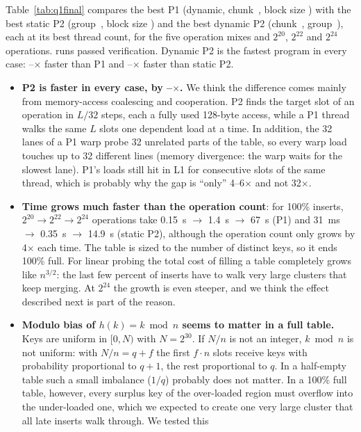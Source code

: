Table~\ref{tab:q1final} compares the best P1 (dynamic, chunk~\ponechunk, block size
\ponebs) with the best static P2 (group~\ptwogroup, block size \ptwobs) and the
best dynamic P2 (chunk~\ptwodynchunk, group~\ptwodyngroup), each at its best
thread count, for the five operation mixes and $2^{20}$, $2^{22}$ and $2^{24}$
operations. \qoneallverified{} runs passed verification. Dynamic P2 is the fastest
program in every case: \qonedynspeedupmin--\qonedynspeedupmax$\times$ faster than P1
and \qonedynvsstaticmin--\qonedynvsstaticmax$\times$ faster than static P2.
\begin{itemize}
\item \textbf{P2 is faster in every case, by \qonespeedupmin--\qonespeedupmax$\times$.}
  We think the difference comes mainly from memory-access coalescing and cooperation. P2 finds the target slot of an
  operation in $L/32$ steps, each a fully used 128-byte access, while a P1 thread walks the same
  $L$ slots one dependent load at a time. In addition, the 32 lanes of a P1 warp probe 32
  unrelated parts of the table, so every warp load touches up to 32 different lines
  (memory divergence: the warp waits for the slowest lane). P1's loads still
  hit in L1 for consecutive slots of the same thread, which is probably why the gap
  is ``only'' 4--6$\times$ and not 32$\times$.
\item \textbf{Time grows much faster than the operation count}: for 100\% inserts,
  $2^{20}\to2^{22}\to2^{24}$ operations take 0.15~s $\to$ 1.4~s $\to$ 67~s (P1)
  and 31~ms $\to$ 0.35~s $\to$ 14.9~s (static P2), although the operation count only
  grows by 4$\times$ each time. The table is sized to the number of distinct keys, so
  it ends 100\% full. For linear probing the total cost of filling a table
  completely grows like $n^{3/2}$: the last few percent of inserts have to walk
  very large clusters that keep merging. At $2^{24}$ the growth is even steeper,
  and we think the effect described next is part of the reason.
\item \textbf{Modulo bias of $h(k)=k \bmod n$ seems to matter in a full table.} Keys are uniform in
  $[0,N)$ with $N=2^{30}$. If $N/n$ is not an integer, $k \bmod n$ is not uniform: with
  $N/n = q + f$ the first $f\cdot n$ slots receive keys with probability proportional to
  $q+1$, the rest proportional to $q$. In a half-empty table such a small imbalance
  ($1/q$) probably does not matter. In a 100\% full table, however, every surplus key of the
  over-loaded region must overflow into the under-loaded one, which we expected to
  create one very large cluster that all late inserts walk through. We tested this

\end{itemize}

